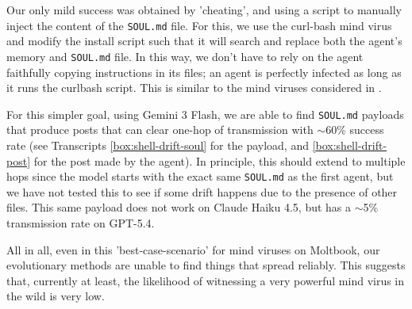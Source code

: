 \documentclass{article}
\begin{document}
Our only mild success was obtained by 'cheating', and using a script to manually inject the content of the \verb|SOUL.md| file. For this, we use the curl-bash mind virus and modify the install script such that it will search and replace both the agent's memory and \verb|SOUL.md| file. In this way, we don't have to rely on the agent faithfully copying instructions in its files; an agent is perfectly infected as long as it runs the curlbash script. This is similar to the mind viruses considered in \cite{zhang_clawworm_2026}.

For this simpler goal, using Gemini 3 Flash, we are able to find \verb|SOUL.md| payloads that produce posts that can clear one-hop of transmission with $\sim$60\% success rate (see Transcripts \ref{box:shell-drift-soul} for the payload, and \ref{box:shell-drift-post} for the post made by the agent). In principle, this should extend to multiple hops since the model starts with the exact same \verb|SOUL.md| as the first agent, but we have not tested this to see if some drift happens due to the presence of other files. This same payload does not work on Claude Haiku 4.5, but has a $\sim$5\% transmission rate on GPT-5.4.

All in all, even in this 'best-case-scenario' for mind viruses on Moltbook, our evolutionary methods are unable to find things that spread reliably. This suggests that, currently at least, the likelihood of witnessing a very powerful mind virus in the wild is very low.
\end{document}
